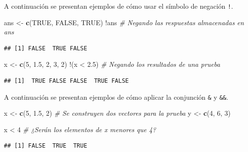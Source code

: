\documentclass[10pt,]{krantz}
\makeatletter
\newenvironment{Shaded}{\begin{snugshade}}{\end{snugshade}}
\newcommand{\KeywordTok}[1]{\textcolor[rgb]{0.13,0.29,0.53}{\textbf{{#1}}}}
\newcommand{\DecValTok}[1]{\textcolor[rgb]{0.00,0.00,0.81}{{#1}}}
\newcommand{\FloatTok}[1]{\textcolor[rgb]{0.00,0.00,0.81}{{#1}}}
\newcommand{\StringTok}[1]{\textcolor[rgb]{0.31,0.60,0.02}{{#1}}}
\newcommand{\CommentTok}[1]{\textcolor[rgb]{0.56,0.35,0.01}{\textit{{#1}}}}
\newcommand{\OtherTok}[1]{\textcolor[rgb]{0.56,0.35,0.01}{{#1}}}
\newcommand{\NormalTok}[1]{{#1}}
\newenvironment{kframe}{%
\medskip{}
\setlength{\fboxsep}{.8em}
 \def\at@end@of@kframe{}%
 \ifinner\ifhmode%
  \def\at@end@of@kframe{\end{minipage}}%
  \begin{minipage}{\columnwidth}%
 \fi\fi%
 \def\FrameCommand##1{\hskip\@totalleftmargin \hskip-\fboxsep
 \colorbox{shadecolor}{##1}\hskip-\fboxsep
     \hskip-\linewidth \hskip-\@totalleftmargin \hskip\columnwidth}%
 \MakeFramed {\advance\hsize-\width
   \@totalleftmargin\z@ \linewidth\hsize
   \@setminipage}}%
 {\par\unskip\endMakeFramed%
 \at@end@of@kframe}
\renewenvironment{Shaded}{\begin{kframe}}{\end{kframe}}
\makeatother
\begin{document}
A continuación se presentan ejemplos de cómo usar el símbolo de negación
\texttt{!}.

\begin{Shaded}
\begin{Highlighting}[]
\NormalTok{ans <-}\StringTok{ }\KeywordTok{c}\NormalTok{(}\OtherTok{TRUE}\NormalTok{, }\OtherTok{FALSE}\NormalTok{, }\OtherTok{TRUE}\NormalTok{)}
\NormalTok{!ans  }\CommentTok{# Negando las respuestas almacenadas en ans}
\end{Highlighting}
\end{Shaded}

\begin{verbatim}
## [1] FALSE  TRUE FALSE
\end{verbatim}

\begin{Shaded}
\begin{Highlighting}[]
\NormalTok{x <-}\StringTok{ }\KeywordTok{c}\NormalTok{(}\DecValTok{5}\NormalTok{, }\FloatTok{1.5}\NormalTok{, }\DecValTok{2}\NormalTok{, }\DecValTok{3}\NormalTok{, }\DecValTok{2}\NormalTok{)}
\NormalTok{!(x <}\StringTok{ }\FloatTok{2.5}\NormalTok{)  }\CommentTok{# Negando los resultados de una prueba}
\end{Highlighting}
\end{Shaded}

\begin{verbatim}
## [1]  TRUE FALSE FALSE  TRUE FALSE
\end{verbatim}

A continuación se presentan ejemplos de cómo aplicar la conjunción
\texttt{\&} y \texttt{\&\&}.

\begin{Shaded}
\begin{Highlighting}[]
\NormalTok{x <-}\StringTok{ }\KeywordTok{c}\NormalTok{(}\DecValTok{5}\NormalTok{, }\FloatTok{1.5}\NormalTok{, }\DecValTok{2}\NormalTok{)  }\CommentTok{# Se construyen dos vectores para la prueba}
\NormalTok{y <-}\StringTok{ }\KeywordTok{c}\NormalTok{(}\DecValTok{4}\NormalTok{, }\DecValTok{6}\NormalTok{, }\DecValTok{3}\NormalTok{)}

\NormalTok{x <}\StringTok{ }\DecValTok{4}  \CommentTok{# ¿Serán los elementos de x menores que 4?}
\end{Highlighting}
\end{Shaded}

\begin{verbatim}
## [1] FALSE  TRUE  TRUE
\end{verbatim}
\end{document}
